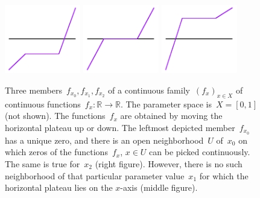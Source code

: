 \documentclass[graybox]{svmult}
\newcommand{\RR}{\mathbb{R}}
\renewcommand{\_}{\mathpunct{.}\,}
\newcommand{\?}{\,{:}\,}
\begin{document}
\begin{figure}
  \centering
  \includegraphics[height=3cm]{zeros-in-families-still-1}
  \includegraphics[height=3cm]{zeros-in-families-still-2}
  \includegraphics[height=3cm]{zeros-in-families-still-3}

  \caption{\label{fig:ivt}Three members~$f_{x_0}, f_{x_1}, f_{x_2}$ of a continuous
  family~$(f_x)_{x \in X}$ of continuous functions~$f_x : \RR \to \RR$. The
  parameter space is~$X = [0,1]$ (not shown). The functions~$f_x$ are
  obtained by moving the horizontal plateau up or
  down. The leftmost depicted member~$f_{x_0}$ has a unique
  zero, and there is an open neighborhood~$U$ of~$x_0$ on which zeros of the
  functions~$f_x$, $x \in U$ can be picked continuously. The same is true
  for~$x_2$ (right figure). However, there is no
  such neighborhood of that particular parameter value~$x_1$ for which the
  horizontal plateau lies on the $x$-axis (middle figure).}
\end{figure}
\end{document}
